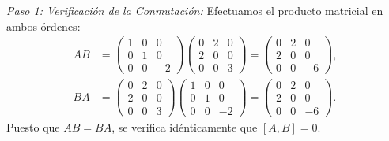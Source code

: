 \begin{ejemplobox}
    \textit{Paso 1: Verificación de la Conmutación:}
    Efectuamos el producto matricial en ambos órdenes:
    \begin{align}
        AB &= \begin{pmatrix} 1 & 0 & 0 \\ 0 & 1 & 0 \\ 0 & 0 & -2 \end{pmatrix} \begin{pmatrix} 0 & 2 & 0 \\ 2 & 0 & 0 \\ 0 & 0 & 3 \end{pmatrix} = \begin{pmatrix} 0 & 2 & 0 \\ 2 & 0 & 0 \\ 0 & 0 & -6 \end{pmatrix}, \\
        BA &= \begin{pmatrix} 0 & 2 & 0 \\ 2 & 0 & 0 \\ 0 & 0 & 3 \end{pmatrix} \begin{pmatrix} 1 & 0 & 0 \\ 0 & 1 & 0 \\ 0 & 0 & -2 \end{pmatrix} = \begin{pmatrix} 0 & 2 & 0 \\ 2 & 0 & 0 \\ 0 & 0 & -6 \end{pmatrix}.
    \end{align}
    Puesto que $AB = BA$, se verifica idénticamente que $[A, B] = 0$.


\end{ejemplobox}

